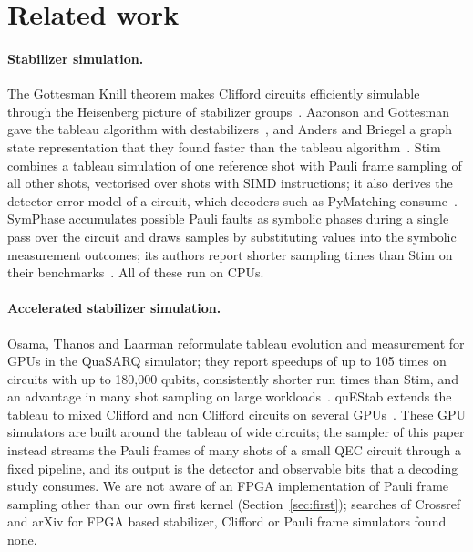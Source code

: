 \section{Related work}\label{sec:related}

\paragraph{Stabilizer simulation.} The Gottesman Knill theorem makes Clifford circuits efficiently simulable through
the Heisenberg picture of stabilizer groups~\cite{gottesman1998heisenberg}. Aaronson and Gottesman gave the tableau
algorithm with destabilizers~\cite{aaronson2004chp}, and Anders and Briegel a graph state representation that they found
faster than the tableau algorithm~\cite{anders2006graph}. Stim~\cite{gidney2021stim} combines a tableau simulation of one
reference shot with Pauli frame sampling of all other shots, vectorised over shots with SIMD instructions; it also
derives the detector error model of a circuit, which decoders such as PyMatching consume~\cite{higgott2022pymatching,
higgott2025sparse}. SymPhase accumulates possible Pauli faults as symbolic phases during a single pass over the circuit and draws
samples by substituting values into the symbolic measurement outcomes; its authors report shorter sampling times than
Stim on their benchmarks~\cite{fang2024symphase}. All of these run on CPUs.

\paragraph{Accelerated stabilizer simulation.} Osama, Thanos and Laarman reformulate tableau evolution and
measurement for GPUs in the QuaSARQ simulator; they report speedups of up to 105 times on circuits with up to 180,000
qubits, consistently shorter run times than Stim, and an advantage in many shot sampling on large
workloads~\cite{osama2026gpu}. quEStab extends the tableau to mixed Clifford and non Clifford circuits on several
GPUs~\cite{shin2026questab}. These GPU simulators are built around the tableau of wide circuits; the sampler of this
paper instead streams the Pauli frames of many shots of a small QEC circuit through a fixed pipeline, and its output is
the detector and observable bits that a decoding study consumes. We are not aware of an FPGA implementation of Pauli
frame sampling other than our own first kernel (Section~\ref{sec:first}); searches of Crossref and arXiv for FPGA
based stabilizer, Clifford or Pauli frame simulators found none.


